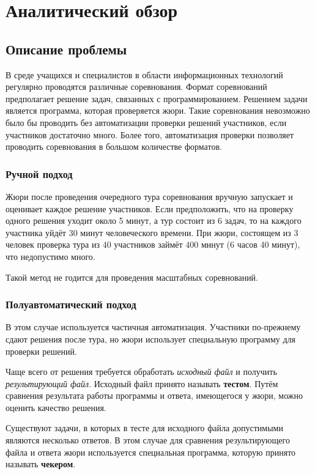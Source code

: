 \chapter{Аналитический обзор}

\section{Описание проблемы}
В среде учащихся и специалистов в области информационных технологий
регулярно проводятся различные соревнования. Формат соревнований предполагает решение задач,
связанных с программированием. Решением задачи является программа, которая проверяется жюри.
Такие соревнования невозможно было бы проводить без автоматизации проверки решений участников,
если участников достаточно много. Более того, автоматизация проверки позволяет проводить соревнования
в большом количестве форматов.

\subsection{Ручной подход}
Жюри после проведения очередного тура соревнования
вручную запускает и оценивает каждое решение участников. Если предположить, что
на проверку одного решения уходит около 5 минут, а тур состоит из 6 задач, то на каждого
участника уйдёт 30 минут человеческого времени. При жюри, состоящем из 3 человек
проверка тура из 40 участников займёт 400 минут (6 часов 40 минут), что недопустимо много.

Такой метод не годится для проведения масштабных соревнований.

\subsection{Полуавтоматический подход}
В этом случае используется частичная автоматизация. Участники по-прежнему сдают решения
после тура, но жюри использует специальную программу для проверки решений.

Чаще всего от решения требуется обработать \textit{исходный файл} и получить \textit{результирующий файл}.
Исходный файл принято называть \textbf{тестом}. Путём сравнения результата работы программы
и ответа, имеющегося у жюри, можно оценить качество решения.

Существуют задачи, в которых в тесте для исходного файла допустимыми являются несколько ответов.
В этом случае для сравнения результирующего файла и ответа жюри используется
специальная программа, которую принято называть \textbf{чекером}.

